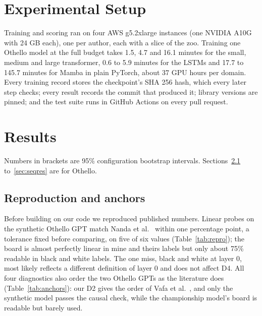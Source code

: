 \documentclass[journal]{IEEEtran}
\begin{document}
\section{Experimental Setup}
Training and scoring ran on four AWS g5.2xlarge instances (one NVIDIA A10G with 24 GB each), one per author, each
with a slice of the zoo. Training one Othello model at the full budget takes 1.5, 4.7 and 16.1 minutes for the
small, medium and large transformer, 0.6 to 5.9 minutes for the LSTMs and 17.7 to 145.7 minutes for Mamba in plain
PyTorch, about 37 GPU hours per domain. Every training record stores the checkpoint's SHA 256 hash, which every
later step checks; every result records the commit that produced it; library versions are pinned; and the test
suite runs in GitHub Actions on every pull request.

\section{Results}
\label{sec:results}
Numbers in brackets are 95\% configuration bootstrap intervals. Sections~\ref{sec:repro} to~\ref{sec:seqres} are
for Othello.

\subsection{Reproduction and anchors}
\label{sec:repro}
Before building on our code we reproduced published numbers. Linear probes on the synthetic Othello GPT match Nanda
et al.~\cite{nanda2023emergent} within one percentage point, a tolerance fixed before comparing, on five of six
values (Table~\ref{tab:repro}); the board is almost perfectly linear in mine and theirs labels but only about 75\%
readable in black and white labels. The one miss, black and white at layer 0, most likely reflects a different
definition of layer 0 and does not affect D4. All four diagnostics also order the two Othello GPTs as the literature
does (Table~\ref{tab:anchors}): our D2 gives the order of Vafa et al.~\cite{vafa2024evaluating}, and only the
synthetic model passes the causal check, while the championship model's board is readable but barely used.
\end{document}
